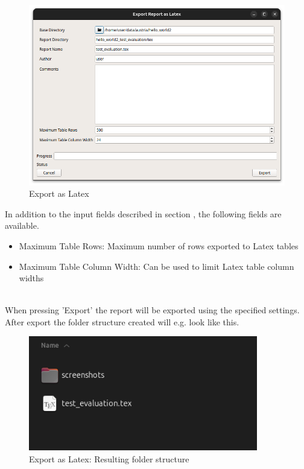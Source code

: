 \begin{figure}[H]
    \hspace*{-2.5cm}
    \center
    \includegraphics[width=12cm,frame]{figures/export_latex.png}
  \caption{Export as Latex}
\end{figure}

In addition to the input fields described in section , 
the following fields are available.

\begin{itemize}  
    \item Maximum Table Rows: Maximum number of rows exported to Latex tables
    \item Maximum Table Column Width: Can be used to limit Latex table column widths
\end{itemize}
\ \\

When pressing 'Export' the report will be exported using the specified settings.
After export the folder structure created will e.g. look like this.

\begin{figure}[H]
    \hspace*{-2.5cm}
    \center
    \includegraphics[width=10cm,frame]{figures/export_latex_result.png}
  \caption{Export as Latex: Resulting folder structure}
\end{figure}

